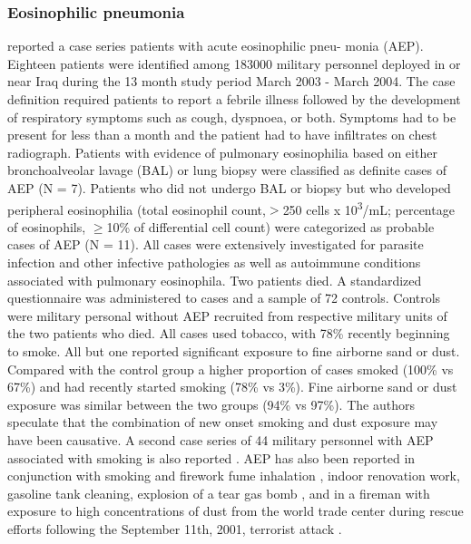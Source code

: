 \documentclass[a4
er,12pt]{article}
\begin{document}
\subsubsection{Eosinophilic pneumonia}
\cite{Shorr2004}  reported a case series patients with acute eosinophilic pneu- monia (AEP). Eighteen patients were identified among 183000 military personnel deployed in or near Iraq during the 13 month study period March 2003 - March 2004. The case definition required patients to report a febrile illness followed by the development of respiratory symptoms such as cough, dyspnoea, or both. Symptoms had to be present for less than a month and the patient had to have infiltrates on chest radiograph. Patients with evidence of pulmonary eosinophilia based on either bronchoalveolar lavage (BAL) or lung biopsy were classified as definite cases of AEP (N = 7).  Patients who did not undergo BAL or biopsy but who developed peripheral eosinophilia (total eosinophil count,\ensuremath{>}250 cells x 10\textsuperscript{3}/mL; percentage of eosinophils,  \ensuremath{\geq}10\% of differential cell count) were categorized as probable cases of AEP (N = 11). All cases were extensively investigated for parasite infection and other infective pathologies as well as autoimmune conditions associated with pulmonary eosinophila. Two patients died. A standardized questionnaire was administered to cases and a sample of 72 controls. Controls were military personal without AEP recruited from respective military units of the two patients who died. All cases used tobacco, with 78\% recently beginning to smoke. All but one reported significant exposure to fine airborne sand or dust. Compared with the control group a higher proportion of cases smoked (100\% vs 67\%) and had recently started smoking (78\% vs 3\%). Fine airborne sand or dust exposure was similar between the two groups (94\% vs 97\%). The authors speculate that the combination of new onset smoking and dust exposure may have been causative. A second case series of 44 military personnel with AEP associated with smoking is also reported \cite{Sine2011}. AEP has also been reported in conjunction with smoking and firework fume inhalation \cite{Hirai2000}, indoor renovation work, gasoline tank cleaning, explosion of a tear gas bomb \cite{Philit2002}, and in a fireman with exposure to high concentrations of dust from the world trade center during rescue efforts following the September 11th, 2001, terrorist attack \cite{Rom2002}.
\end{document}
